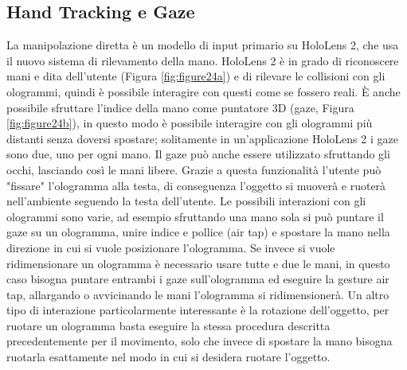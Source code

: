 \subsection{Hand Tracking e Gaze}
La manipolazione diretta è un modello di input primario su HoloLens 2, che usa il nuovo sistema di rilevamento della mano.
HoloLens 2 è in grado di riconoscere mani e dita dell'utente (Figura \ref{fig:figure24a}) e di rilevare le collisioni con gli ologrammi, quindi è possibile interagire con questi come se fossero reali.
È anche possibile sfruttare l'indice della mano come puntatore 3D (gaze, Figura \ref{fig:figure24b}), in questo modo è possibile interagire con gli ologrammi più distanti senza doversi spostare; solitamente in un'applicazione HoloLens 2 i gaze sono due, uno per ogni mano.
Il gaze può anche essere utilizzato sfruttando gli occhi, lasciando così le mani libere.
Grazie a questa funzionalità l'utente può "fissare" l'ologramma alla testa, di conseguenza l'oggetto si muoverà e ruoterà nell'ambiente seguendo la testa dell'utente.
Le possibili interazioni con gli ologrammi sono varie, ad esempio sfruttando una mano sola si può puntare il gaze su un ologramma, unire indice e pollice (air tap) e spostare la mano nella direzione in cui si vuole posizionare l'ologramma.
Se invece si vuole ridimensionare un ologramma è necessario usare tutte e due le mani, in questo caso bisogna puntare entrambi i gaze sull'ologramma ed eseguire la gesture air tap, allargando o avvicinando le mani l'ologramma si ridimensionerà.
Un altro tipo di interazione particolarmente interessante è la rotazione dell'oggetto, per ruotare un ologramma basta eseguire la stessa procedura descritta precedentemente per il movimento, solo che invece di spostare la mano bisogna ruotarla esattamente nel modo in cui si desidera ruotare l'oggetto.

